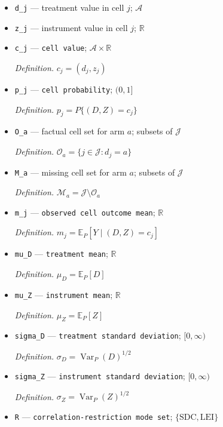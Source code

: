 \documentclass{article}
\begin{document}
\begin{itemize}
  \item \texttt{d\_\allowbreak{}j} --- treatment value in cell \(j\); \(\mathcal A\)
  \item \texttt{z\_\allowbreak{}j} --- instrument value in cell \(j\); \(\mathbb R\)
  \item \texttt{c\_\allowbreak{}j} --- \texttt{cell value}; \(\mathcal A\times\mathbb R\)
  \par\smallskip\noindent\emph{Definition.} \(c_j=(d_j,z_j)\)
  \item \texttt{p\_\allowbreak{}j} --- \texttt{cell probability}; \((0,1]\)
  \par\smallskip\noindent\emph{Definition.} \(p_j=P\{(D,Z)=c_j\}\)
  \item \texttt{O\_\allowbreak{}a} --- factual cell set for arm \(a\); subsets of \(\mathcal J\)
  \par\smallskip\noindent\emph{Definition.} \(\mathcal O_a=\{j\in\mathcal J:d_j=a\}\)
  \item \texttt{M\_\allowbreak{}a} --- missing cell set for arm \(a\); subsets of \(\mathcal J\)
  \par\smallskip\noindent\emph{Definition.} \(\mathcal M_a=\mathcal J\setminus\mathcal O_a\)
  \item \texttt{m\_\allowbreak{}j} --- \texttt{observed cell outcome mean}; \(\mathbb R\)
  \par\smallskip\noindent\emph{Definition.} \(m_j=\mathbb E_P[Y\mid(D,Z)=c_j]\)
  \item \texttt{mu\_\allowbreak{}D} --- \texttt{treatment mean}; \(\mathbb R\)
  \par\smallskip\noindent\emph{Definition.} \(\mu_D=\mathbb E_P[D]\)
  \item \texttt{mu\_\allowbreak{}Z} --- \texttt{instrument mean}; \(\mathbb R\)
  \par\smallskip\noindent\emph{Definition.} \(\mu_Z=\mathbb E_P[Z]\)
  \item \texttt{sigma\_\allowbreak{}D} --- \texttt{treatment standard deviation}; \([0,\infty)\)
  \par\smallskip\noindent\emph{Definition.} \(\sigma_D=\operatorname{Var}_P(D)^{1/2}\)
  \item \texttt{sigma\_\allowbreak{}Z} --- \texttt{instrument standard deviation}; \([0,\infty)\)
  \par\smallskip\noindent\emph{Definition.} \(\sigma_Z=\operatorname{Var}_P(Z)^{1/2}\)
  \item \texttt{R} --- \texttt{correlation-\allowbreak{}restriction mode set}; \(\{\mathrm{SDC},\mathrm{LEI}\}\)

\end{itemize}
\end{document}
